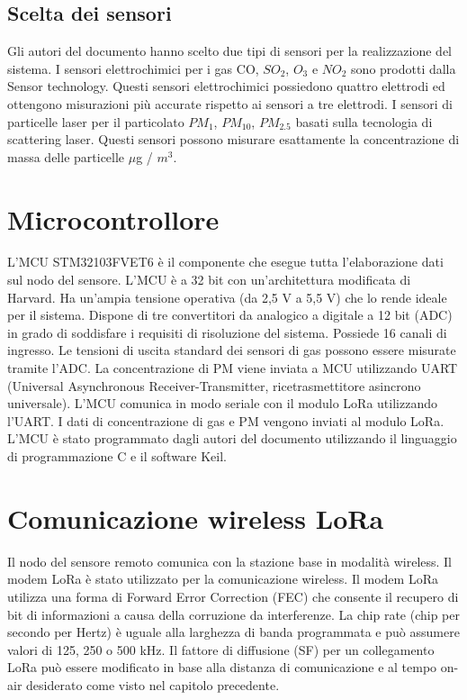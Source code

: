 \documentclass[a4paper]{report} %
\begin{document}
\subsection{Scelta dei sensori}
Gli autori del documento \cite{art:rif.40} hanno scelto due tipi di sensori per la realizzazione del sistema.
I sensori elettrochimici per i gas CO, $ SO_{2} $, $ O_{3} $ e $ NO_{2} $ sono prodotti dalla Sensor technology. 
Questi sensori elettrochimici possiedono quattro elettrodi ed ottengono misurazioni più accurate rispetto ai sensori a tre elettrodi.
I sensori di particelle laser per il particolato $ PM_{1} $, $ PM_{10} $, $ PM_{2.5} $ basati sulla tecnologia di scattering laser.
Questi sensori possono misurare esattamente la concentrazione di massa delle particelle $\mu$g / $ m^3 $. 


\section{Microcontrollore}
L'MCU STM32103FVET6 è il componente che esegue tutta l'elaborazione dati sul nodo del sensore. 
L'MCU è a 32 bit con un'architettura modificata di Harvard. Ha un'ampia tensione operativa (da 2,5 V a 5,5 V) che lo rende ideale per il sistema. Dispone di tre convertitori da analogico a digitale a 12 bit (ADC) in grado di soddisfare i requisiti di risoluzione del sistema. Possiede 16 canali di ingresso. Le tensioni di uscita standard dei sensori di gas possono essere misurate tramite l'ADC. La concentrazione di PM viene inviata a MCU utilizzando UART (Universal Asynchronous Receiver-Transmitter, ricetrasmettitore asincrono universale). L'MCU comunica in modo seriale con il modulo LoRa utilizzando l'UART. I dati di concentrazione di gas e PM vengono inviati al modulo LoRa. L'MCU è stato programmato dagli autori del documento \cite{art:rif.40} utilizzando il linguaggio di programmazione C e il software Keil.

\section{Comunicazione wireless LoRa}
Il nodo del sensore remoto comunica con la stazione base in modalità wireless. Il modem LoRa è stato utilizzato per la comunicazione wireless. Il modem LoRa utilizza una forma di Forward Error Correction (FEC) che consente il recupero di bit di informazioni a causa della corruzione da interferenze. La chip rate (chip per secondo per Hertz) è uguale alla larghezza di banda programmata e può assumere valori di 125, 250 o 500 kHz. Il fattore di diffusione (SF) per un collegamento LoRa può essere modificato in base alla distanza di comunicazione e al tempo on-air desiderato come visto nel capitolo precedente.  
\end{document}

